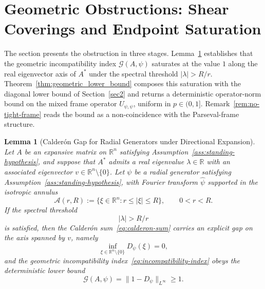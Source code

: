 \documentclass[pdflatex,sn-basic,Numbered]{sn-jnl}
\theoremstyle{thmstyleone}%
\newtheorem{lemma}{Lemma}%
\theoremstyle{thmstylethree}%
\begin{document}
\section{Geometric Obstructions: Shear Coverings and Endpoint Saturation}\label{sec3}

The section presents the obstruction in three stages.
Lemma~\ref{lem:shear_covering} establishes that the geometric
incompatibility index $\mathcal{G}(A, \psi)$ saturates at the value
$1$ along the real eigenvector axis of $A^{*}$ under the spectral
threshold $|\lambda| > R / r$.
Theorem~\ref{thm:geometric_lower_bound} composes this saturation
with the diagonal lower bound of Section~\ref{sec2} and returns a
deterministic operator-norm bound on the mixed frame operator
$U_{\psi, \psi}$, uniform in $p \in (0, 1]$.
Remark~\ref{rem:no-tight-frame} reads the bound as a non-coincidence
with the Parseval-frame structure.


\begin{lemma}[Calder\'on Gap for Radial Generators under Directional Expansion]\label{lem:shear_covering}
	Let $A$ be an expansive matrix on $\mathbb{R}^n$ satisfying
	Assumption~\ref{ass:standing-hypothesis}, and suppose that $A^{*}$ admits a
	real eigenvalue $\lambda \in \mathbb{R}$ with an associated eigenvector
	$v \in \mathbb{R}^n \setminus \{0\}$. Let $\psi$ be a radial generator
	satisfying Assumption~\ref{ass:standing-hypothesis}, with Fourier transform
	$\widehat{\psi}$ supported in the isotropic annulus
	\begin{equation}\label{eq:iso-annulus}
		\mathcal{A}(r, R)
		:=\bigl\{ \xi \in \mathbb{R}^n : r \le |\xi| \le R \bigr\},
		\qquad 0 <r < R .
	\end{equation}
	If the spectral threshold
	\begin{equation}\label{eq:spectral-threshold}
		|\lambda| > R / r
	\end{equation}
	is satisfied, then the Calder\'on sum~\eqref{eq:calderon-sum} carries an
	explicit gap on the axis spanned by $v$, namely
	\begin{equation}\label{eq:cs-gap}
		\inf_{\xi \in \mathbb{R}^n \setminus \{0\}} D_{\psi}(\xi) = 0,
	\end{equation}
	and the geometric incompatibility
	index~\eqref{eq:incompatibility-index} obeys the deterministic lower bound
	\begin{equation}\label{eq:incompatibility-saturated}
		\mathcal{G}(A, \psi)
		=\bigl\| 1-D_{\psi} \bigr\|_{L^\infty}
		\ge 1 .
	\end{equation}
\end{lemma}
\end{document}
